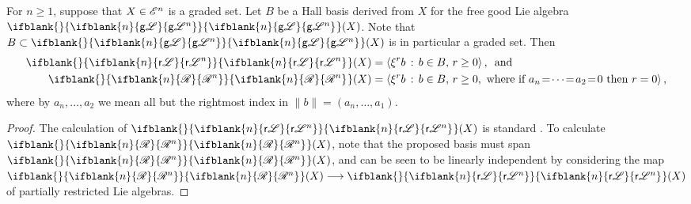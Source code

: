 \documentclass[10pt]{article}
\newcommand{\GS}[1]{\scrE^{#1}}
\newcommand{\RestLie}[1]%
{\ifblank{#1}{\mathsf{r}{\scrL}}{\mathsf{r}{\scrL}^{#1}}}
\newcommand{\GoodLie}[1]%
{\ifblank{#1}{\mathsf{g}{\scrL}}{\mathsf{g}{\scrL}^{#1}}}
\newcommand{\BadLie}[1]%
{\ifblank{#1}{\mathsf{b}{\scrL}}{\mathsf{b}{\scrL}^{#1}}}
\newcommand{\PRLie}[1]%
{\ifblank{#1}{\scrR}{\scrR^{#1}}}
\newcommand{\iteratedrestn}[2]{\xi^{#2}{#1}}
\newcommand{\Fr}[2][]{\ifblank{#1}{#2}{#2_{#1}}}
\begin{document}
\begin{CategoriesOfInterest}
\begin{prop}\label{PropBasesOfFreeLieAlgs}
For $n\geq1$, suppose that $X\in\GS{n}$ is a graded set. Let $B$ be a Hall basis derived from $X$ for the free good Lie algebra $\Fr{\GoodLie{n}}(X)$. Note that $B\subset \Fr{\GoodLie{n}}(X)$ is in particular a graded set. Then
\begin{alignat*}{2}
\Fr{\RestLie{n}}(X)
&=
\left\langle \iteratedrestn{b}{r}\,:\,b\in
B,\,r\geq0\right\rangle\textup{, \ and}%
\\
\Fr{\PRLie{n}}(X)
&=
\left\langle \iteratedrestn{b}{r}\,:\,b\in
B,\,r\geq0,\textup{ where if }a_{n}\!=\!\cdots\!=\!a_2\!=\!0\textup{ then $r=0$}\right\rangle,%
\end{alignat*}
where by $a_n,\ldots,a_2$ we mean all but the rightmost index in $\|b\|=(a_{n},\ldots,a_1)$.
\end{prop}
\begin{proof}
The calculation of $\Fr{\RestLie{n}}(X)$ is standard \cite[Proposition 14, p.66]{MR886063}.
To calculate $\Fr{\PRLie{n}}(X)$, note that the proposed basis must span $\Fr{\PRLie{n}}(X)$, and can be seen to be linearly independent by considering the map $\Fr{\PRLie{n}}(X)\to \Fr{\RestLie{n}}(X)$ of partially restricted Lie algebras.
\end{proof}



\end{CategoriesOfInterest}
\end{document}
